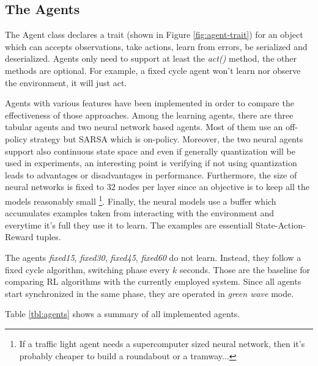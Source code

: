 \subsection{The Agents}

The Agent class declares a trait (shown in Figure \ref{fig:agent-trait}) for an object which can accepts observations, take actions, learn from errors, be serialized and deserialized. Agents only need to support at least the \textit{act()} method, the other methods are optional. For example, a fixed cycle agent won't learn nor observe the environment, it will just act.


Agents with various features have been implemented in order to compare the effectiveness of those approaches. Among the learning agents, there are three tabular agents and two neural network based agents. Most of them use an off-policy strategy but SARSA which is on-policy. Moreover, the two neural agents support also continuous state space and even if generally quantization will be used in experiments, an interesting point is verifying if not using quantization leads to advantages or disadvantages in performance. Furthermore, the size of neural networks is fixed to $32$ nodes per layer since an objective is to keep all the models reasonably small \footnote{If a traffic light agent needs a supercomputer sized neural network, then it's probably cheaper to build a roundabout or a tramway...}.
Finally, the neural models use a buffer which accumulates examples taken from interacting with the environment and everytime it's full they use it to learn. The examples are essentiall State-Action-Reward tuples.

The agents \textit{fixed15}, \textit{fixed30}, \textit{fixed45}, \textit{fixed60} do not learn. Instead, they follow a fixed cycle algorithm, switching phase every $k$ seconds.
Those are the baseline for comparing RL algorithms with the currently employed system. Since all agents start synchronized in the same phase, they are operated in \textit{green wave} mode.

Table \ref{tbl:agents} shows a summary of all implemented agents.

